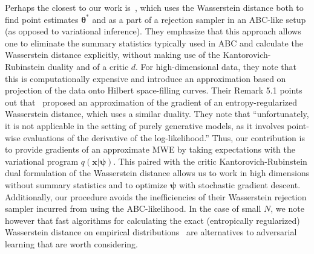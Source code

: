 \documentclass[twocolumn,superscriptaddress,aps]{revtex4-1}
\newcommand{\kcnote}[1]{\textcolor{red}{[KC: #1]}}
\newcommand{\bftheta}{{\bm \theta}}
\newcommand{\bfpsi}{{\bm \psi}}
\newcommand{\bfx}{\mathbf{x}}
\theoremstyle{plain}
\begin{document}

Perhaps the closest to our work is~\cite{bernton2017inference}, which uses the
Wasserstein distance both to find point estimates $\bftheta^*$ and as a part of
a rejection sampler in an ABC-like setup (as opposed to variational inference).
They emphasize that this approach allows one to eliminate the summary statistics
typically used in ABC and calculate the Wasserstein distance explicitly, without
making use of the Kantorovich-Rubinstein duality and of a critic $d$. For high-dimensional
data, they note that this is computationally expensive and introduce an
approximation based on projection of the data onto Hilbert space-filling curves.
Their Remark 5.1 points out that~\citep{montavon2016wasserstein} proposed an
approximation of the gradient of an entropy-regularized Wasserstein distance,
which uses a similar duality. They note that ``unfortunately, it is not
applicable in the setting of purely generative models, as it involves point-wise
evaluations of the derivative of the log-likelihood.'' Thus, our contribution is
to provide gradients of an approximate MWE by taking expectations with the
variational program $q(\bfx | \bfpsi)$. This paired with the critic
Kantorovich-Rubinstein dual formulation of the Wasserstein distance
allows us to work in high dimensions without summary statistics and to
optimize $\bfpsi$ with stochastic gradient descent. Additionally,
our procedure avoids the inefficiencies of
their Wasserstein rejection sampler incurred from using the ABC-likelihood.
In the case of small $N$, we note however that fast algorithms for calculating the exact (entropically regularized) Wasserstein distance on
empirical distributions~\citep{cuturi2013sinkhorn, genevay2016stochastic, montavon2016wasserstein}
are alternatives to adversarial learning that are worth considering.


\end{document}
